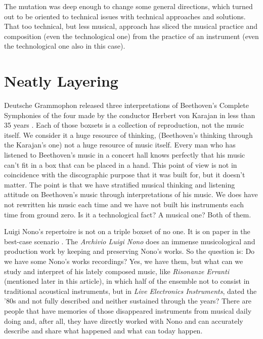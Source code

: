 \documentclass[twoside,a4paper]{article}
\begin{document}
The mutation was deep enough to change some general directions, which turned out to be oriented to technical issues with technical approaches and solutions. That too technical, but less musical, approach has sliced the musical practice and composition (even the technological one) from the practice of an instrument (even the technological one also in this case). 


\section{Neatly Layering}
\label{sec:layering}

Deutsche Grammophon released three interpretations of Beethoven's Complete Symphonies of the four made by the conductor Herbert von Karajan in less than 35 years \cite{rrrnyt}. Each of those boxsets is a collection of reproduction, not the music itself. We consider it a huge resource of thinking, (Beethoven's thinking through the Karajan's one) not a huge resource of music itself. Every man who has listened to Beethoven's music in a concert hall knows perfectly that his music can't fit in a box that can be placed in a hand. This point of view is not in coincidence with the discographic purpose that it was built for, but it doesn't matter. The point is that we have stratified musical thinking and listening attitude on Beethoven's music through interpretations of his music. We does have not rewritten his music each time and we have not built his instruments each time from ground zero. Is it a technological fact? A musical one? Both of them.

Luigi Nono's repertoire is not on a triple boxset of no one. It is on paper in the best-case scenario \cite{raprmt}. The \emph{Archivio Luigi Nono} does an immense musicological and production work by keeping and preserving Nono's works. So the question is: Do we have some Nono's works recordings? Yes, we have them, but what can we study and interpret of his lately composed music, like \emph{Risonanze Erranti} (mentioned later in this article), in which half of the ensemble not to consist in traditional acoustical instruments, but in \emph{Live Electronics Instruments}, dated the '80s and not fully described and neither sustained through the years? There are people that have memories of those disappeared instruments from musical daily doing and, after all, they have directly worked with Nono and can accurately describe and share what happened and what can today happen. 
\end{document}
